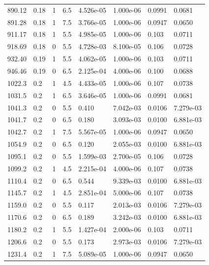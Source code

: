 \documentclass[preview]{standalone}
\begin{document}
{{{\begin{tabular}{L{1.2cm}C{1.2cm} C{0.3cm}C{0.5cm} C{1.4cm}C{1.4cm} C{1.4cm}C{1.4cm}}
  890.12  &  0.18  & 1     & 6.5 &  4.526e-05  & 1.000e-06  & 0.0991 &  0.0681   \\ 
  891.28  &  0.18  & 1     & 7.5 &  3.766e-05  & 1.000e-06  & 0.0947 &  0.0650   \\ 
  911.17  &  0.18  & 1     & 5.5 &  4.985e-05  & 1.000e-06  & 0.103 &  0.0711   \\ 
  918.69  &  0.18  & 0     & 5.5 &  4.728e-03  & 8.100e-05  & 0.106 &  0.0728   \\ 
  932.40  &  0.19  & 1     & 5.5 &  4.062e-05  & 1.000e-06  & 0.103 &  0.0711   \\ 
  946.46  &  0.19  & 0     & 6.5 &  2.125e-04  & 4.000e-06  & 0.100 &  0.0688   \\ 
  1022.3  &   0.2  & 1     & 4.5 &  4.433e-05  & 1.000e-06  & 0.107 &  0.0738   \\ 
  1031.5  &   0.2  & 1     & 6.5 &  3.646e-05  & 1.000e-06  & 0.0991 &  0.0681   \\ 
  1041.3  &   0.2  & 0     & 5.5 &  0.410  & 7.042e-03  & 0.0106 &  7.279e-03   \\ 
  1041.7  &   0.2  & 0     & 6.5 &  0.180  & 3.093e-03  & 0.0100 &  6.881e-03   \\ 
  1042.7  &   0.2  & 1     & 7.5 &  5.567e-05  & 1.000e-06  & 0.0947 &  0.0650   \\ 
  1054.9  &   0.2  & 0     & 6.5 &  0.120  & 2.055e-03  & 0.0100 &  6.881e-03   \\ 
  1095.1  &   0.2  & 0     & 5.5 &  1.599e-03  & 2.700e-05  & 0.106 &  0.0728   \\ 
  1099.2  &   0.2  & 1     & 4.5 &  2.215e-04  & 4.000e-06  & 0.107 &  0.0738   \\ 
  1110.4  &   0.2  & 0     & 6.5 &  0.544  & 9.339e-03  & 0.0100 &  6.881e-03   \\ 
  1145.7  &   0.2  & 1     & 4.5 &  2.851e-04  & 5.000e-06  & 0.107 &  0.0738   \\ 
  1159.0  &   0.2  & 0     & 5.5 &  0.117  & 2.013e-03  & 0.0106 &  7.279e-03   \\ 
  1170.6  &   0.2  & 0     & 6.5 &  0.189  & 3.242e-03  & 0.0100 &  6.881e-03   \\ 
  1180.2  &   0.2  & 1     & 5.5 &  1.427e-04  & 2.000e-06  & 0.103 &  0.0711   \\ 
  1206.6  &   0.2  & 0     & 5.5 &  0.173  & 2.973e-03  & 0.0106 &  7.279e-03   \\ 
  1231.4  &   0.2  & 1     & 7.5 &  5.089e-05  & 1.000e-06  & 0.0947 &  0.0650   \\ 

\end{tabular}}}}
\end{document}
